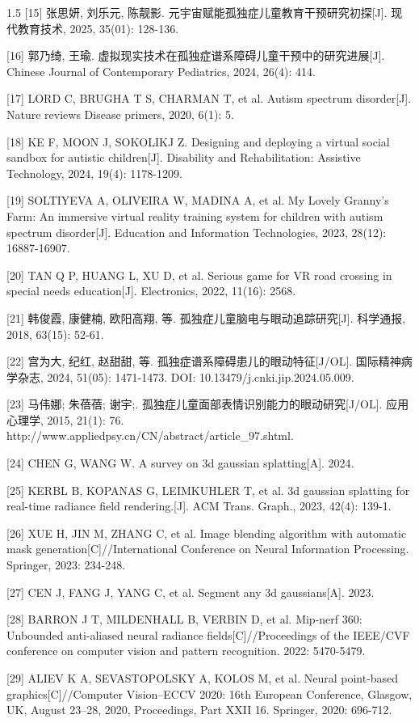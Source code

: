 \documentclass[zihao=-4]{ctexart}
\begin{document}
\begin{spacing}{1.5}
[15] 张思妍, 刘乐元, 陈靓影. 元宇宙赋能孤独症儿童教育干预研究初探[J]. 现代教育技术, 2025, 35(01): 128-136.

[16] 郭乃绮, 王瑜. 虚拟现实技术在孤独症谱系障碍儿童干预中的研究进展[J]. Chinese Journal of Contemporary Pediatrics, 2024, 26(4): 414.

[17] LORD C, BRUGHA T S, CHARMAN T, et al. Autism spectrum disorder[J]. Nature reviews Disease primers, 2020, 6(1): 5.

[18] KE F, MOON J, SOKOLIKJ Z. Designing and deploying a virtual social sandbox for autistic children[J]. Disability and Rehabilitation: Assistive Technology, 2024, 19(4): 1178-1209.

[19] SOLTIYEVA A, OLIVEIRA W, MADINA A, et al. My Lovely Granny’s Farm: An immersive virtual reality training system for children with autism spectrum disorder[J]. Education and Information Technologies, 2023, 28(12): 16887-16907.

[20] TAN Q P, HUANG L, XU D, et al. Serious game for VR road crossing in special needs education[J]. Electronics, 2022, 11(16): 2568.

[21] 韩俊霞, 康健楠, 欧阳高翔, 等. 孤独症儿童脑电与眼动追踪研究[J]. 科学通报, 2018, 63(15): 52-61.

[22] 宫为大, 纪红, 赵甜甜, 等. 孤独症谱系障碍患儿的眼动特征[J/OL]. 国际精神病学杂志, 2024, 51(05): 1471-1473. DOI: 10.13479/j.cnki.jip.2024.05.009.

[23] 马伟娜; 朱蓓蓓; 谢宇;. 孤独症儿童面部表情识别能力的眼动研究[J/OL]. 应用心理学, 2015, 21(1): 76. http://www.appliedpsy.cn/CN/abstract/article\_97.shtml.

[24] CHEN G, WANG W. A survey on 3d gaussian splatting[A]. 2024.

[25] KERBL B, KOPANAS G, LEIMKUHLER T, et al. 3d gaussian splatting for real-time radiance field rendering.[J]. ACM Trans. Graph., 2023, 42(4): 139-1.

[26] XUE H, JIN M, ZHANG C, et al. Image blending algorithm with automatic mask generation[C]//International Conference on Neural Information Processing. Springer, 2023: 234-248.

[27] CEN J, FANG J, YANG C, et al. Segment any 3d gaussians[A]. 2023.

[28] BARRON J T, MILDENHALL B, VERBIN D, et al. Mip-nerf 360: Unbounded anti-aliased neural radiance fields[C]//Proceedings of the IEEE/CVF conference on computer vision and pattern recognition. 2022: 5470-5479.

[29] ALIEV K A, SEVASTOPOLSKY A, KOLOS M, et al. Neural point-based graphics[C]//Computer Vision--ECCV 2020: 16th European Conference, Glasgow, UK, August 23--28, 2020, Proceedings, Part XXII 16. Springer, 2020: 696-712.


\end{spacing}
\end{document}
